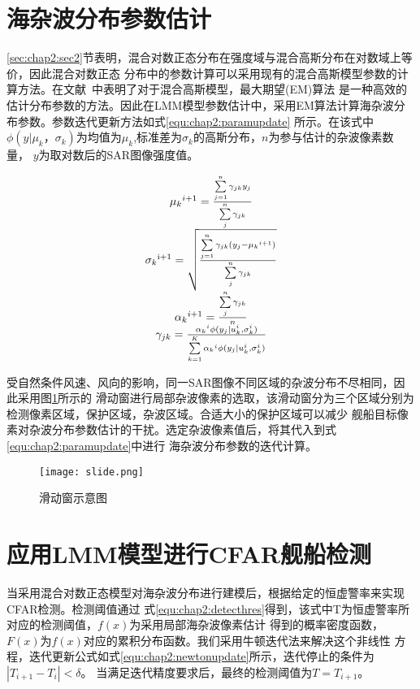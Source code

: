   \section{海杂波分布参数估计}

      \ref{sec:chap2:sec2}节表明，混合对数正态分布在强度域与混合高斯分布在对数域上等价，因此混合对数正态
      分布中的参数计算可以采用现有的混合高斯模型参数的计算方法。在文献~\cite{6087012}中表明了对于混合高斯模型，最大期望(EM)算法
      是一种高效的估计分布参数的方法。因此在LMM模型参数估计中，采用EM算法计算海杂波分布参数。参数迭代更新方法如式\ref{equ:chap2:paramupdate}
      所示。在该式中$\phi (y|{\mu _k}，{\sigma _k})$为均值为$\mu_k$,标准差为$\sigma_k$的高斯分布，$n$为参与估计的杂波像素数量，
      $y$为取对数后的SAR图像强度值。      

    \begin{equation}
      \label{equ:chap2:paramupdate}
      \begin{array}{*{20}{c}}
        {{\mu _k}^{i + 1} = \frac{{\sum\limits_{j = 1}^n {{\gamma _{jk}}{y_j}} }}{{\sum\limits_j^n {{\gamma _{jk}}} }}}\\
        {{\sigma _k}^{{\rm{i}} + 1} = \sqrt {\frac{{\sum\limits_{j = 1}^n {{\gamma _{jk}}({y_j} - {\mu _k}^{i + 1})} }}{{\sum\limits_j^n {{\gamma _{jk}}} }}} }\\
        {{\alpha _k}^{i + 1} = \frac{{\sum\limits_j^n {{\gamma _{jk}}} }}{n}}\\
        {{\gamma _{jk}} = \frac{{{\alpha _k}^i\phi ({y_j}|u_k^i,\sigma _k^i)}}{{\sum\limits_{k = 1}^K {{\alpha _k}^i\phi ({y_j}|u_k^i,\sigma _k^i)} }}}
      \end{array}
    \end{equation}

    受自然条件风速、风向的影响，同一SAR图像不同区域的杂波分布不尽相同，因此采用图\ref{fig:chap2:slide}所示的
    滑动窗进行局部杂波像素的选取，该滑动窗分为三个区域分别为检测像素区域，保护区域，杂波区域。合适大小的保护区域可以减少
    舰船目标像素对杂波分布参数估计的干扰。选定杂波像素值后，将其代入到式\ref{equ:chap2:paramupdate}中进行
    海杂波分布参数的迭代计算。

    \begin{figure}[H] %
      \centering
      \texttt{[image: slide.png]}
      \caption{滑动窗示意图}
      \label{fig:chap2:slide}
    \end{figure}   
\section{应用LMM模型进行CFAR舰船检测}
    当采用混合对数正态模型对海杂波分布进行建模后，根据给定的恒虚警率来实现CFAR检测。检测阈值通过
    式\ref{equ:chap2:detecthres}得到，该式中T为恒虚警率所对应的检测阈值，$f(x)$为采用局部海杂波像素估计
    得到的概率密度函数，$F(x)$为$f(x)$对应的累积分布函数。我们采用牛顿迭代法来解决这个非线性
    方程，迭代更新公式如式\ref{equ:chap2:newtonupdate}所示，迭代停止的条件为$\left| {{T_{i + 1}} - {T_i}} \right| < \delta$。
    当满足迭代精度要求后，最终的检测阈值为${T} = {T_{i + 1}}$。

